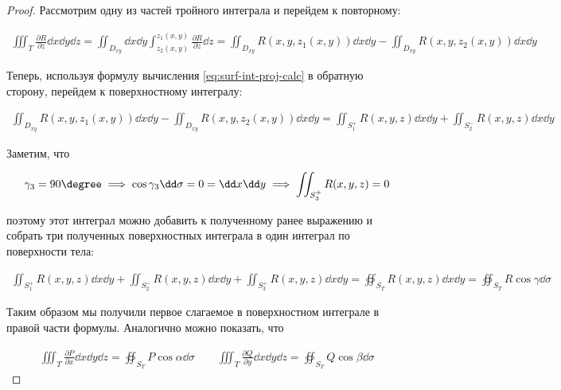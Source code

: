 \begin{proof}
  Рассмотрим одну из частей тройного интеграла и перейдем к повторному:

  \begin{align*}
    \iiint_{T} \frac{\partial R}{\partial z} \dd x \dd y \dd z
    = \iint_{D_{xy}} \dd x \dd y \int_{z_{2}(x, y)}^{z_{1}(x, y)}
      \frac{\partial R}{\partial z} \dd z
    = \iint_{D_{xy}} R(x, y, z_{1}(x, y)) \dd x \dd y
      - \iint_{D_{xy}} R(x, y, z_{2}(x, y)) \dd x \dd y
  \end{align*}

  Теперь, используя формулу вычисления \eqref{eq:surf-int-proj-calc} в обратную
  сторону, перейдем к поверхностному интегралу:
  
  \begin{align*}
    \iint_{D_{xy}} R(x, y, z_{1}(x, y)) \dd x \dd y
      - \iint_{D_{xy}} R(x, y, z_{2}(x, y)) \dd x \dd y
    = \iint_{S_{1}^{+}} R(x, y, z) \dd x \dd y
      + \iint_{S_{2}^{-}} R(x, y, z) \dd x \dd y
  \end{align*}

  Заметим, что

  \begin{align*}
    \gamma_{3} = 90 \degree
    \implies \cos \gamma_{3} \dd \sigma = 0 = \dd x \dd y
    \implies \iint_{S_{3}^{+}} R(x, y, z) = 0
  \end{align*}

  поэтому этот интеграл можно добавить к полученному ранее выражению и собрать
  три полученных поверхностных интеграла в один интеграл по поверхности тела:

  \begin{align*}
    \iint_{S_{1}^{+}} R(x, y, z) \dd x \dd y
      + \iint_{S_{2}^{-}} R(x, y, z) \dd x \dd y
      + \iint_{S_{3}^{+}} R(x, y, z) \dd x \dd y
    = \oiint_{S_{T}} R(x, y, z) \dd x \dd y
    = \oiint_{S_{T}} R \cos \gamma \dd \sigma
  \end{align*}

  Таким образом мы получили первое слагаемое в поверхностном интеграле в правой
  части формулы. Аналогично можно показать, что

  \begin{align*}
    \iiint_{T} \frac{\partial P}{\partial x} \dd x \dd y \dd z =
      \oiint_{S_{T}} P \cos \alpha \dd \sigma
    \qquad
    \iiint_{T} \frac{\partial Q}{\partial y} \dd x \dd y \dd z =
      \oiint_{S_{T}} Q \cos \beta \dd \sigma
  \end{align*}
\end{proof}